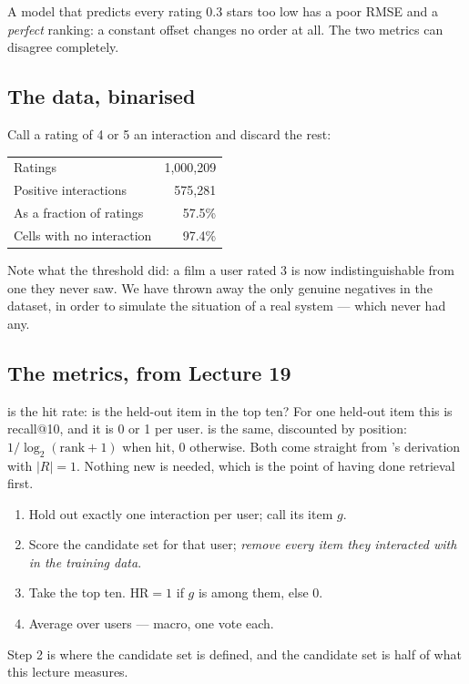 \documentclass[11pt,a4paper]{article}
\begin{document}
\begin{keybox}[title={A concrete case}]
A model that predicts every rating 0.3 stars too low has a poor RMSE and a
\emph{perfect} ranking: a constant offset changes no order at all. The two
metrics can disagree completely.
\end{keybox}

\subsection{The data, binarised}

Call a rating of 4 or 5 an interaction and discard the rest:

\begin{center}
\small
\begin{tabular}{lr}
\toprule
Ratings                    & 1{,}000{,}209 \\
Positive interactions      & 575{,}281 \\
As a fraction of ratings   & 57.5\% \\
Cells with no interaction  & 97.4\% \\
\bottomrule
\end{tabular}
\end{center}

Note what the threshold did: a film a user rated 3 is now indistinguishable
from one they never saw. We have thrown away the only genuine negatives in the
dataset, in order to simulate the situation of a real system --- which never
had any.

\subsection{The metrics, from Lecture 19}

 is the hit rate: is the held-out item in the top ten? For one
held-out item this is recall@10, and it is 0 or 1 per user.  is
the same, discounted by position: $1/\log_2(\text{rank}+1)$ when hit, 0
otherwise. Both come straight from 's derivation with $|R| = 1$.
Nothing new is needed, which is the point of having done retrieval first.

\begin{derivbox}[title={HR@10, defined precisely}]
\begin{enumerate}[leftmargin=*,nosep]
  \item Hold out exactly one interaction per user; call its item $g$.
  \item Score the candidate set for that user; \emph{remove every item they
        interacted with in the training data}.
  \item Take the top ten. $\text{HR} = 1$ if $g$ is among them, else 0.
  \item Average over users --- macro, one vote each.
\end{enumerate}
Step 2 is where the candidate set is defined, and the candidate set is half of
what this lecture measures.
\end{derivbox}
\end{document}
